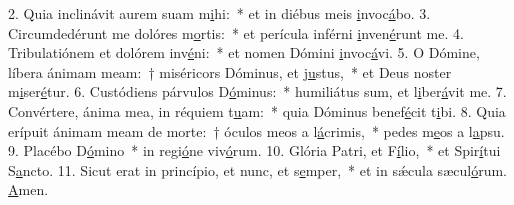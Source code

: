 2. Quia inclinávit aurem suam m\uline{i}hi:~* et in diébus meis \uline{i}nvoc\uline{á}bo.
3. Circumdedérunt me dolóres m\uline{o}rtis:~* et perícula inférni \uline{i}nven\uline{é}runt me.
4. Tribulatiónem et dolórem inv\uline{é}ni:~* et nomen Dómini \uline{i}nvoc\uline{á}vi.
5. O Dómine, líbera ánimam meam:~† miséricors Dóminus, et j\uline{u}stus,~* et Deus noster m\uline{i}ser\uline{é}tur.
6. Custódiens párvulos D\uline{ó}minus:~* humiliátus sum, et l\uline{i}ber\uline{á}vit me.
7. Convértere, ánima mea, in réquiem t\uline{u}am:~* quia Dóminus benef\uline{é}cit t\uline{i}bi.
8. Quia erípuit ánimam meam de morte:~† óculos meos a l\uline{á}crimis,~* pedes m\uline{e}os a l\uline{a}psu.
9. Placébo D\uline{ó}mino~* in regi\uline{ó}ne viv\uline{ó}rum.
10. Glória Patri, et F\uline{í}lio,~* et Spir\uline{í}tui S\uline{a}ncto.
11. Sicut erat in princípio, et nunc, et s\uline{e}mper,~* et in sǽcula sæcul\uline{ó}rum. \uline{A}men.
